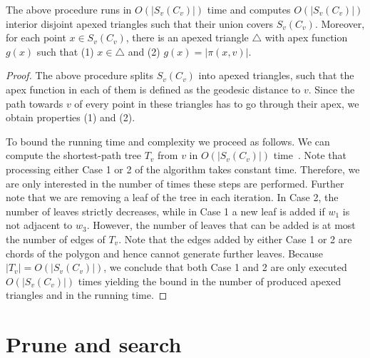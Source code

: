 \documentclass[a4paper,UKenglish]{lipics}
\newcommand{\fn}[2]{\ensuremath{S_{\scriptscriptstyle #1}(#2)}}
\newcommand{\g}[2]{\ensuremath{|\pi(#1, #2)|}}
\newcommand{\luis}[2][says]{}
\newcommand{\mati}[2][says]{}
\begin{document}
\begin{lemma}\label{lemma:Triangles inside funnels}
The above procedure runs in $O(|\fn{v}{C_v}|)$ time and computes $O(|\fn{v}{C_v}|)$ interior disjoint apexed triangles such that their union covers $\fn{v}{C_v}$. Moreover, for each point $x\in \fn{v}{C_v}$, there is an apexed triangle $\triangle$ with apex function $g(x)$ such that (1) $x\in \triangle$ and (2) $g(x) = \g{x}{v}$.
\end{lemma}
\begin{proof}
The above procedure splits $\fn{v}{C_v}$ into apexed triangles, such that the apex function in each of them is defined as the geodesic distance to $v$. Since the path towards $v$ of every point in these triangles has to go through their apex, we obtain properties (1) and (2).

To bound the running time and complexity we proceed as follows. 
We can compute the shortest-path tree $T_v$ from $v$ in $O(|\fn{v}{C_v}|)$ time~\cite{guibasShortestPathTree}.
Note that processing either Case 1 or 2 of the algorithm takes constant time. Therefore, we are only interested in the number of times these steps are performed.\mati{If we agree on the change in description before the analysis becomes much simpler. Overall, each step reduces the number of vertices by one.} \luis{We cannot reduce the number of vertices every time, look above} Further note that we are removing a leaf of the tree in each iteration. In Case 2, the number of leaves strictly decreases, while in Case 1 a new leaf is added if $w_1$ is not adjacent to $w_3$. However, the number of leaves that can be added is at most the number of edges of $T_v$. 
Note that the edges added by either Case 1 or 2 are chords of the polygon and hence cannot generate further leaves. 
Because $|T_v| = O(|\fn{v}{C_v}|)$, we conclude that both Case 1 and 2 are only executed $O(|\fn{v}{C_v}|)$ times yielding the bound in the number of produced apexed triangles and in the running time.
\end{proof}

\section{Prune and search}\label{section:Prune and search}
\end{document}
